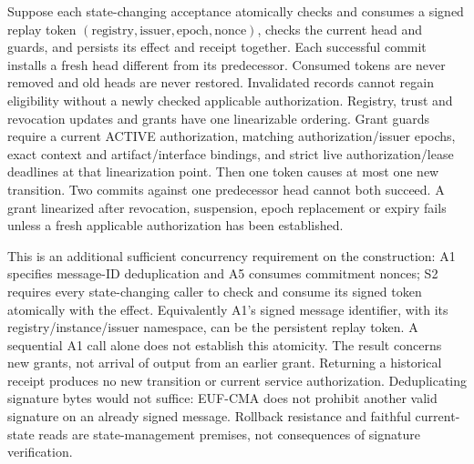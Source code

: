 \begin{securitytheorem}
\label{sec-thm:replay}
Suppose each state-changing acceptance atomically checks and consumes a
signed replay token $(\mathrm{registry},\mathrm{issuer},\mathrm{epoch},
\mathrm{nonce})$, checks the current head and guards, and persists its
effect and receipt together. Each successful commit installs a fresh head
different from its predecessor. Consumed tokens are never removed and old
heads are never restored. Invalidated records cannot regain eligibility
without a newly checked applicable authorization. Registry, trust and
revocation updates and grants have one linearizable ordering.
Grant guards require a current ACTIVE
authorization, matching authorization/issuer epochs, exact context and
artifact/interface bindings, and strict live authorization/lease deadlines
at that linearization point. Then one token causes at most one new transition.
Two commits against one predecessor head cannot both succeed. A grant
linearized after revocation, suspension, epoch replacement or expiry fails
unless a fresh applicable authorization has been established.
\end{securitytheorem}
This is an additional sufficient concurrency requirement on the construction:
A1 specifies message-ID deduplication and A5 consumes commitment nonces;
S2 requires every state-changing caller to check and consume its signed
token atomically with the effect. Equivalently A1's signed message identifier,
with its registry/instance/issuer namespace, can be the persistent replay
token. A sequential A1 call alone does not establish this atomicity.
The result concerns new grants, not arrival of output from an earlier grant.
Returning a historical receipt produces no new transition or current service
authorization. Deduplicating signature bytes would not suffice: EUF-CMA
does not prohibit another valid signature on an already signed message.
Rollback resistance and faithful current-state reads are state-management
premises, not consequences of signature verification.

